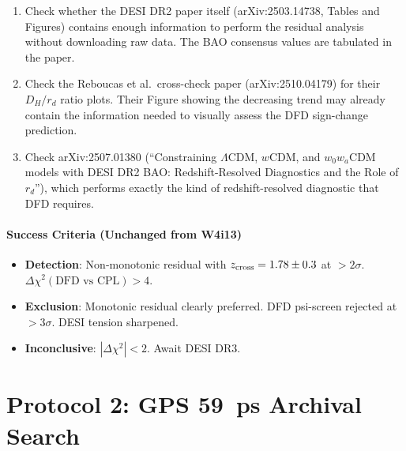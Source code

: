 \documentclass[11pt]{article}
\newcommand{\LCDM}{\Lambda\text{CDM}}
\begin{document}
\begin{enumerate}[label=\textbf{6.\arabic*:}, nosep]
\item Check whether the DESI DR2 paper itself (arXiv:2503.14738,
  Tables and Figures) contains enough information to perform the
  residual analysis without downloading raw data. The BAO consensus
  values are tabulated in the paper.

\item Check the Reboucas et al.\ cross-check paper (arXiv:2510.04179)
  for their $D_H/r_d$ ratio plots. Their Figure showing the decreasing
  trend may already contain the information needed to visually assess
  the DFD sign-change prediction.

\item Check arXiv:2507.01380 (``Constraining $\LCDM$, $w$CDM, and
  $w_0w_a$CDM models with DESI DR2 BAO: Redshift-Resolved Diagnostics
  and the Role of $r_d$''), which performs exactly the kind of
  redshift-resolved diagnostic that DFD requires.
\end{enumerate}

\subsection{Success Criteria (Unchanged from W4i13)}

\begin{itemize}[nosep]
\item \textbf{Detection}: Non-monotonic residual with
  $z_{\rm cross} = 1.78 \pm 0.3$ at $>2\sigma$.
  $\Delta\chi^2(\text{DFD vs CPL}) > 4$.
\item \textbf{Exclusion}: Monotonic residual clearly preferred.
  DFD psi-screen rejected at $>3\sigma$. DESI tension sharpened.
\item \textbf{Inconclusive}: $|\Delta\chi^2| < 2$. Await DESI DR3.
\end{itemize}


\part{Protocol 2: GPS 59~ps Archival Search}
\label{part:gps}
\end{document}
